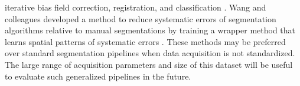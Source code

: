iterative bias field correction, registration, and classification \cite{optimize}. Wang and colleagues developed a method to reduce systematic errors of segmentation algorithms relative to manual segmentations by training a wrapper method that learns spatial patterns of systematic errors \cite{Wang2011}. These methods may be preferred over standard segmentation pipelines when data acquisition is not standardized. The large range of acquisition parameters and size of this dataset will be useful to evaluate such generalized pipelines in the future.